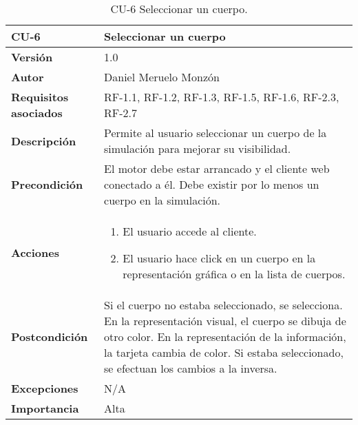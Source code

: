 \begin{table}[p]
	\centering
	\begin{tabularx}{\linewidth}{ p{} p{} }
		\toprule
		\textbf{CU-6}    & \textbf{Seleccionar un cuerpo}\\
		\toprule
		\textbf{Versión}              & 1.0    \\
		\textbf{Autor}                & Daniel Meruelo Monzón \\
		\textbf{Requisitos asociados} & RF-1.1, RF-1.2, RF-1.3, RF-1.5, RF-1.6, RF-2.3, RF-2.7 \\
		\textbf{Descripción}          & Permite al usuario seleccionar un cuerpo de la simulación para mejorar su visibilidad. \\
		\textbf{Precondición}         & El motor debe estar arrancado y el cliente web conectado a él. Debe existir por lo menos un cuerpo en la simulación. \\
		\textbf{Acciones}             &
		\begin{enumerate}
			\def\labelenumi{\arabic{enumi}.}
			\tightlist
			\item El usuario accede al cliente.
			\item El usuario hace click en un cuerpo en la representación gráfica o en la lista de cuerpos.
		\end{enumerate}\\
		\textbf{Postcondición}        & Si el cuerpo no estaba seleccionado, se selecciona. En la representación visual, el cuerpo se dibuja de otro color. En la representación de la información, la tarjeta cambia de color. Si estaba seleccionado, se efectuan los cambios a la inversa.\\
		\textbf{Excepciones}          & N/A \\
		\textbf{Importancia}          & Alta\\
		\bottomrule
	\end{tabularx}
	\caption{CU-6 Seleccionar un cuerpo.}
\end{table}
